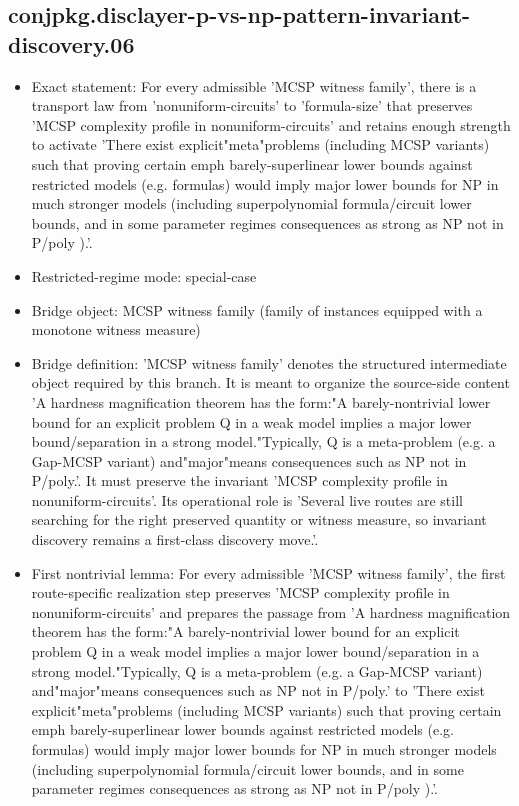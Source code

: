 \documentclass[11pt]{article}
\begin{document}
\subsection*{conjpkg.disclayer-p-vs-np-pattern-invariant-discovery.06}
\begin{itemize}
\item Exact statement: For every admissible 'MCSP witness family', there is a transport law from 'nonuniform-circuits' to 'formula-size' that preserves 'MCSP complexity profile in nonuniform-circuits' and retains enough strength to activate 'There exist explicit"meta"problems (including MCSP variants) such that proving certain emph barely-superlinear lower bounds against restricted models (e.g. formulas) would imply major lower bounds for NP in much stronger models (including superpolynomial formula/circuit lower bounds, and in some parameter regimes consequences as strong as NP not in P/poly ).'.
\item Restricted-regime mode: special-case
\item Bridge object: MCSP witness family (family of instances equipped with a monotone witness measure)
\item Bridge definition: 'MCSP witness family' denotes the structured intermediate object required by this branch. It is meant to organize the source-side content 'A hardness magnification theorem has the form:"A barely-nontrivial lower bound for an explicit problem Q in a weak model implies a major lower bound/separation in a strong model."Typically, Q is a meta-problem (e.g. a Gap-MCSP variant) and"major"means consequences such as NP not in P/poly.'. It must preserve the invariant 'MCSP complexity profile in nonuniform-circuits'. Its operational role is 'Several live routes are still searching for the right preserved quantity or witness measure, so invariant discovery remains a first-class discovery move.'.
\item First nontrivial lemma: For every admissible 'MCSP witness family', the first route-specific realization step preserves 'MCSP complexity profile in nonuniform-circuits' and prepares the passage from 'A hardness magnification theorem has the form:"A barely-nontrivial lower bound for an explicit problem Q in a weak model implies a major lower bound/separation in a strong model."Typically, Q is a meta-problem (e.g. a Gap-MCSP variant) and"major"means consequences such as NP not in P/poly.' to 'There exist explicit"meta"problems (including MCSP variants) such that proving certain emph barely-superlinear lower bounds against restricted models (e.g. formulas) would imply major lower bounds for NP in much stronger models (including superpolynomial formula/circuit lower bounds, and in some parameter regimes consequences as strong as NP not in P/poly ).'.

\end{itemize}
\end{document}

